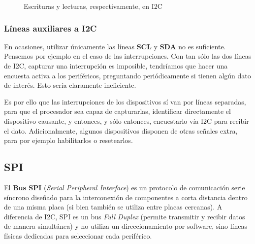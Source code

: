 \documentclass[../main.tex]{subfiles}
\begin{document}
\begin{figure}[h!]
{%
                }
                \caption{Escrituras y lecturas, respectivamente, en I2C}
                \label{fig:i2c_read_write}
            \end{figure}
                    
        \subsubsection{Líneas auxiliares a I2C}

            En ocasiones, utilizar únicamente las líneas \textbf{SCL} y \textbf{SDA} no es suficiente. Pensemos por ejemplo en el caso de las interrupciones. Con tan sólo las dos líneas de I2C, capturar una interrupción es imposible, tendríamos que hacer una encuesta activa a los periféricos, preguntando periódicamente si tienen algún dato de interés. Esto sería claramente ineficiente.

            Es por ello que las interrupciones de los dispositivos sí van por líneas separadas, para que el procesador sea capaz de capturarlas, identificar directamente el dispositivo causante, y entonces, y sólo entonces, encuestarlo vía I2C para recibir el dato. Adicionalmente, algunos dispositivos disponen de otras señales extra, para por ejemplo habilitarlos o resetearlos.

    \subsection{SPI}

        El \textbf{Bus SPI} (\emph{Serial Peripheral Interface}) es un protocolo de comunicación serie síncrono diseñado para la interconexión de componentes a corta distancia dentro de una misma placa (si bien también se utiliza entre placas cercanas). A diferencia de I2C, SPI es un bus \emph{Full Duplex} (permite transmitir y recibir datos de manera simultánea) y no utiliza un direccionamiento por software, sino líneas físicas dedicadas para seleccionar cada periférico.
\end{document}
